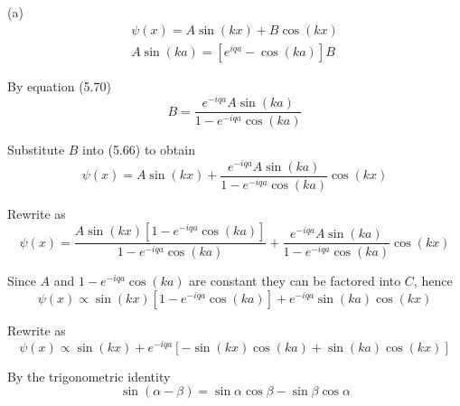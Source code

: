 


\bigskip
(a)
\begin{gather*}
\psi(x)=A\sin(kx)+B\cos(kx)\tag{5.66}
\\
A\sin(ka)=\left[e^{iqa}-\cos(ka)\right]B\tag{5.70}
\end{gather*}

By equation (5.70)
\begin{equation*}
B=\frac{e^{-iqa}A\sin(ka)}{1-e^{-iqa}\cos(ka)}
\end{equation*}

Substitute $B$ into (5.66) to obtain
\begin{equation*}
\psi(x)=A\sin(kx)+\frac{e^{-iqa}A\sin(ka)}{1-e^{-iqa}\cos(ka)}\cos(kx)
\end{equation*}

Rewrite as
\begin{equation*}
\psi(x)=\frac{A\sin(kx)[1-e^{-iqa}\cos(ka)]}{1-e^{-iqa}\cos(ka)}
+\frac{e^{-iqa}A\sin(ka)}{1-e^{-iqa}\cos(ka)}\cos(kx)
\end{equation*}

Since $A$ and $1-e^{-iqa}\cos(ka)$ are constant they can be factored into $C$, hence
\begin{equation*}
\psi(x)\propto\sin(kx)[1-e^{-iqa}\cos(ka)]
+e^{-iqa}\sin(ka)\cos(kx)
\end{equation*}

Rewrite as
\begin{equation*}
\psi(x)\propto\sin(kx)+e^{-iqa}[-\sin(kx)\cos(ka)+\sin(ka)\cos(kx)]
\end{equation*}

By the trigonometric identity
\begin{equation*}
\sin(\alpha-\beta)=\sin\alpha\cos\beta-\sin\beta\cos\alpha
\end{equation*}

